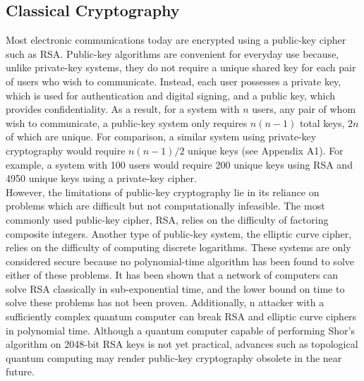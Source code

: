 \documentclass[conference]{IEEEtran}
\begin{document}
\subsection{Classical Cryptography}
Most electronic communications today are encrypted using a public-key cipher such as RSA\cite{Rivest}. Public-key algorithms are convenient for everyday use because, unlike private-key systems, they do not require a unique shared key for each pair of users who wish to communicate. Instead, each user possesses a private key, which is used for authentication and digital signing, and a public key, which provides confidentiality. As a result, for a system with $n$ users, any pair of whom wish to communicate, a public-key system only requires $n(n-1)$ total keys, $2n$ of which are unique. For comparison, a similar system using private-key cryptography would require $n(n-1)/2$ unique keys (see Appendix A1). For example, a system with 100 users would require 200 unique keys using RSA and 4950 unique keys using a private-key cipher.\\

However, the limitations of public-key cryptography lie in its reliance on problems which are difficult but not computationally infeasible. The most commonly used public-key cipher, RSA, relies on the difficulty of factoring composite integers\cite{Rivest}. Another type of public-key system, the elliptic curve cipher, relies on the difficulty of computing discrete logarithms\cite{Rosing}. These systems are only considered secure because no polynomial-time algorithm has been found to solve either of these problems. It has been shown that a network of computers can solve RSA classically in sub-exponential time\cite{Weisstein}, and the lower bound on time to solve these problems has not been proven. Additionally, n attacker with a sufficiently complex quantum computer can break RSA and elliptic curve ciphers in polynomial time\cite{Shor}. Although a quantum computer capable of performing Shor's algorithm on 2048-bit RSA keys is not yet practical, advances such as topological quantum computing may render public-key cryptography obsolete in the near future.\\
\end{document}

